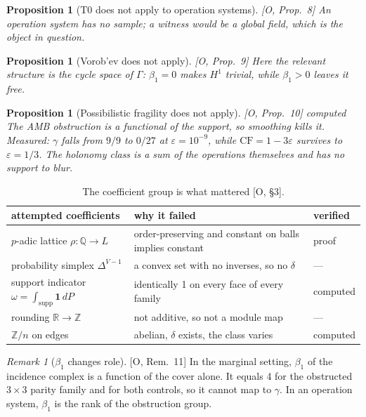 \documentclass[11pt]{article}
\newtheorem{proposition}[theorem]{Proposition}
\theoremstyle{definition}
\theoremstyle{remark}
\newtheorem{remark}[theorem]{Remark}
\newcommand{\Z}{\mathbb{Z}}
\newcommand{\Q}{\mathbb{Q}}
\newcommand{\R}{\mathbb{R}}
\newcommand{\CF}{\mathrm{CF}}
\newcommand{\one}{\mathbf{1}}
\newcommand{\src}[1]{\textsf{\small[#1]}}
\newcommand{\st}[1]{\textsf{\small\color{gray}#1}}
\begin{document}
\begin{proposition}[T0 does not apply to operation systems]\label{res:auto6}\src{O, Prop.~8} An operation system has no sample; a witness would be a global field, which is the object in question.\end{proposition}
\begin{proposition}[Vorob'ev does not apply]\label{res:auto7}\src{O, Prop.~9} Here the relevant structure is the cycle space of $\Gamma$: $\beta_1=0$ makes $H^1$ trivial, while $\beta_1>0$ leaves it free.\end{proposition}
\begin{proposition}[Possibilistic fragility does not apply]\label{prop:frag}
\src{O, Prop.~10} \st{computed}
The AMB obstruction is a functional of the support, so smoothing kills it. Measured: $\gamma$ falls from $9/9$ to $0/27$ at $\varepsilon=10^{-9}$, while $\CF=1-3\varepsilon$ survives to $\varepsilon=1/3$. The holonomy class is a sum of the operations themselves and has no support to blur.
\end{proposition}

\begin{table}[!htbp]\centering\small
\begin{tabularx}{\linewidth}{@{}l>{\raggedright}X l@{}}
\toprule
attempted coefficients & why it failed & verified\\
\midrule
$p$-adic lattice $\rho:\Q\to L$ & order-preserving and constant on balls implies constant & proof\\
probability simplex $\Delta^{V-1}$ & a convex set with no inverses, so no $\delta$ & ---\\
support indicator $\omega=\int_{\mathrm{supp}}\one\,dP$ & identically 1 on every face of every family & computed\\
rounding $\R\to\Z$ & not additive, so not a module map & ---\\
\midrule
$\Z/n$ on edges & abelian, $\delta$ exists, the class varies & computed\\
\bottomrule
\end{tabularx}
\caption{The coefficient group is what mattered \src{O, \S3}.}
\end{table}
\begin{remark}[$\beta_1$ changes role]\src{O, Rem.~11} In the marginal setting, $\beta_1$ of the incidence complex is a function of the cover alone. It equals 4 for the obstructed $3\times3$ parity family and for both controls, so it cannot map to $\gamma$. In an operation system, $\beta_1$ is the rank of the obstruction group.\end{remark}
\end{document}
